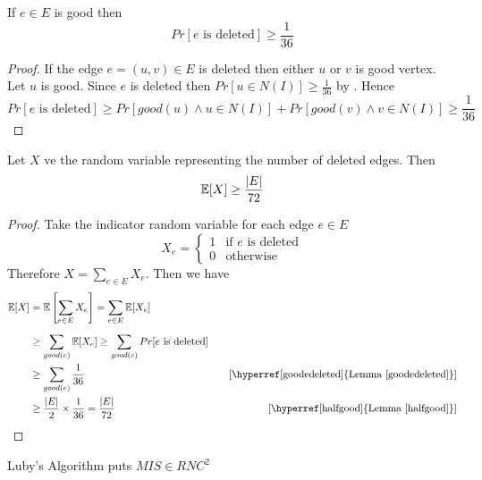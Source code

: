 \begin{lemma}\label{goodedeleted}
	If $e\in E$ is good then $$Pr[\text{$e$ is deleted}]\geq \frac1{36}$$
\end{lemma}
\begin{proof}
	If the edge $e=(u,v)\in E$ is deleted then either $u$ or $v$ is good vertex. Let $u$ is good. Since $e$ is deleted then $Pr[u\in N(I)]\geq \frac1{36}$ by . Hence $$Pr[\text{$e$ is deleted}]\geq Pr[good(u)\wedge u\in N(I)] + Pr[good(v)\wedge v\in N(I)]\geq \frac1{36}$$
\end{proof}

\begin{lemma}
	Let $X$ ve the random variable representing the number of deleted edges. Then $$\mathbb{E}[X]\geq \frac{|E|}{72}$$
\end{lemma}
\begin{proof}
	Take the indicator random variable for each edge $e\in E$ $$X_e=\begin{cases}
		1& \text{if $e$ is deleted}\\ 0 &\text{otherwise}
	\end{cases}$$
	Therefore $X=\sum\limits_{e\in E}X_e$. Then we have \begin{align*}
		\bbE[X] & = \bbE\lt[ \sum_{e\in E}X_e \rt] = \sum_{e\in E}\bbE[X_e]\\[2mm]
		& \geq \sum_{good(e)}\bbE[X_e]\geq \sum_{good(e)}Pr[\text{$e$ is deleted}]\\ 
		& \geq \sum_{good(e)}\frac1{36} &\quad [\text{\hyperref[goodedeleted]{Lemma \ref{goodedeleted}}}]\\
		& \geq \frac{|E|}{2}\times \frac1{36}=\frac{|E|}{72}&\quad [\text{\hyperref[halfgood]{Lemma \ref{halfgood}}}]
	\end{align*}
\end{proof}

\begin{theorem}
	Luby's Algorithm puts $MIS\in RNC^2$
\end{theorem}